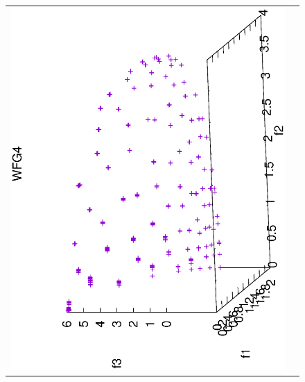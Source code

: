 \begin{figure}[H]
\begin{tabular}{cc}
  \includegraphics[scale=0.3, angle=-90,origin=c]{Figures_Chapter7/Results_Chapter4/Summary_Representative/VSD-MOEA-D/WFG4.eps} 
\end{tabular}
\end{figure}

